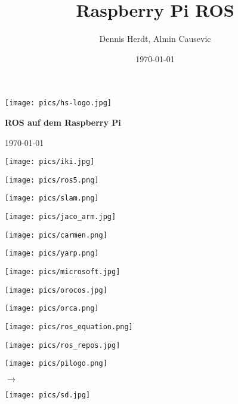 \documentclass{beamer}
\title[Rapi]{Raspberry Pi ROS}
\author[D. Herdt, A. Causevic]{Dennis Herdt, Almin Causevic}
\institute[I_HS Wgt-Rav]{Informatik HS Weingarten-Ravensburg}
\date{\today}
\begin{document}
\begin{frame}[fragile]

\texttt{[image: pics/hs-logo.jpg]}


\vspace{1cm}

\begin{center}

{\bf \huge ROS auf dem Raspberry Pi}
\vspace{2cm}

\today

\end{center}
\end{frame}

\begin{frame}
\centerline{\texttt{[image: pics/iki.jpg]}}
\end{frame}

\begin{frame}
\centerline{\texttt{[image: pics/ros5.png]}}
\end{frame}

\begin{frame}
\centerline{\texttt{[image: pics/slam.png]}}
\end{frame}

\begin{frame}
\centerline{\texttt{[image: pics/jaco\_arm.jpg]}}
\end{frame}

\begin{frame}
\parbox{5cm}{\texttt{[image: pics/carmen.png]}}
\parbox{5cm}{\texttt{[image: pics/yarp.png]}}
\parbox{5cm}{\texttt{[image: pics/microsoft.jpg]}}
\hspace{5cm}
\parbox{5cm}{\texttt{[image: pics/orocos.jpg]}}
\parbox{5cm}{\texttt{[image: pics/orca.png]}}
\end{frame}

\begin{frame}
\centerline{\texttt{[image: pics/ros\_equation.png]}}
\end{frame}

\begin{frame}
\centerline{\texttt{[image: pics/ros\_repos.jpg]}}
\end{frame}


\begin{frame}
\parbox{5cm}{\texttt{[image: pics/pilogo.png]}}
\huge \hfill 
 $\rightarrow$
\parbox{5cm}{\texttt{[image: pics/sd.jpg]}}
\end{frame}
\end{document}
